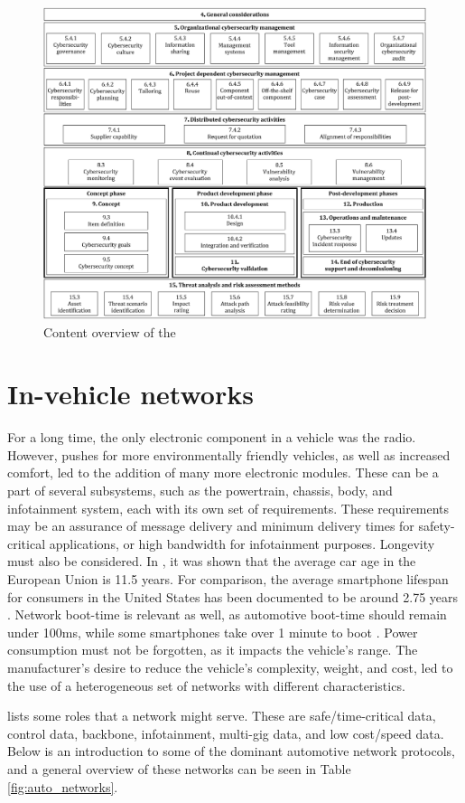 \begin{figure}
    \centering
    \includegraphics[width = \textwidth]{img/parts/introduction/ISO 21434 ToC.png}
    \caption{Content overview of the \cite{ISO21434}}
    \label{fig:iso21434toc}
\end{figure}

\section{In-vehicle networks}

For a long time, the only electronic component in a vehicle was the radio. However, pushes for more environmentally friendly vehicles, as well as increased comfort, led to the addition of many more electronic modules. These can be a part of several subsystems, such as the powertrain, chassis, body, and infotainment system, each with its own set of requirements. These requirements may be an assurance of message delivery and minimum delivery times for safety-critical applications, or high bandwidth for infotainment purposes. Longevity must also be considered. In \cite{AvgCarAge}, it was shown that the average car age in the European Union is 11.5 years. For comparison, the average smartphone lifespan for consumers in the United States has been documented to be around 2.75 years \citep{AvgPhoneAge}. Network boot-time is relevant as well, as automotive boot-time should remain under 100ms, while some smartphones take over 1 minute to boot \citep{AutomotiveNetworks}. Power consumption must not be forgotten, as it impacts the vehicle's range. The manufacturer's desire to reduce the vehicle's complexity, weight, and cost, led to the use of a heterogeneous set of networks with different characteristics.\par
\cite{AutomotiveNetworks} lists some roles that a network might serve. These are safe/time-critical data, control data, backbone, infotainment, multi-gig data, and low cost/speed data. Below is an introduction to some of the dominant automotive network protocols, and a general overview of these networks can be seen in Table \ref{fig:auto_networks}.

